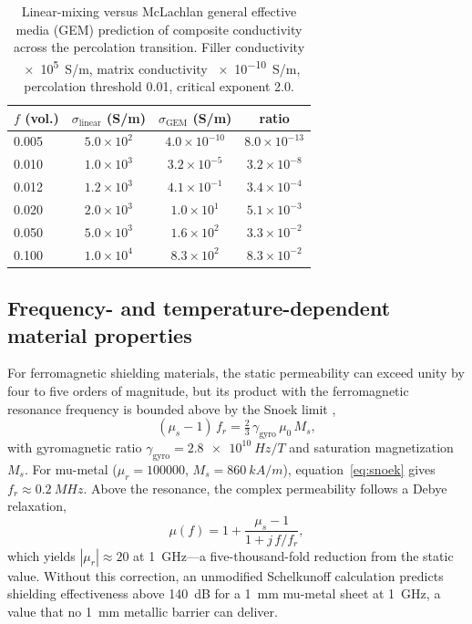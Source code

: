 \documentclass[review,3p,authoryear]{elsarticle}
\begin{document}
\begin{table}[htbp]
\centering
\caption{Linear-mixing versus McLachlan general effective media (GEM) prediction of composite conductivity across the percolation transition. Filler conductivity \SI{e5}{S/m}, matrix conductivity \SI{e-10}{S/m}, percolation threshold \num{0.01}, critical exponent \num{2.0}.}
\label{tab:gem_check}
\begin{tabular}{@{}lccc@{}}
\toprule
$f$ (vol.) & $\sigma_{\mathrm{linear}}$ (\si{S/m}) & $\sigma_{\mathrm{GEM}}$ (\si{S/m}) & ratio \\
\midrule
0.005  & $5.0 \times 10^{2}$  & $4.0 \times 10^{-10}$ & $8.0 \times 10^{-13}$ \\
0.010  & $1.0 \times 10^{3}$  & $3.2 \times 10^{-5}$  & $3.2 \times 10^{-8}$  \\
0.012  & $1.2 \times 10^{3}$  & $4.1 \times 10^{-1}$  & $3.4 \times 10^{-4}$  \\
0.020  & $2.0 \times 10^{3}$  & $1.0 \times 10^{1}$   & $5.1 \times 10^{-3}$  \\
0.050  & $5.0 \times 10^{3}$  & $1.6 \times 10^{2}$   & $3.3 \times 10^{-2}$  \\
0.100  & $1.0 \times 10^{4}$  & $8.3 \times 10^{2}$   & $8.3 \times 10^{-2}$  \\
\bottomrule
\end{tabular}
\end{table}

\subsection{Frequency- and temperature-dependent material properties}
\label{sec:matprops}

For ferromagnetic shielding materials, the static permeability can exceed unity by four to five orders of magnitude, but its product with the ferromagnetic resonance frequency is bounded above by the Snoek limit \citep{Snoek1948},
\begin{equation}
(\mu_s - 1)\, f_r = \tfrac{2}{3}\,\gamma_{\mathrm{gyro}}\, \mu_0\, M_s,
\label{eq:snoek}
\end{equation}
with gyromagnetic ratio $\gamma_{\mathrm{gyro}} = \SI{2.8e10}{Hz/T}$ and saturation magnetization $M_s$. For mu-metal ($\mu_r = \num{100000}$, $M_s = \SI{860}{kA/m}$), equation~\eqref{eq:snoek} gives $f_r \approx \SI{0.2}{MHz}$. Above the resonance, the complex permeability follows a Debye relaxation,
\begin{equation}
\mu(f) = 1 + \frac{\mu_s - 1}{1 + j\,f/f_r},
\label{eq:debye}
\end{equation}
which yields $|\mu_r| \approx 20$ at \SI{1}{GHz}---a five-thousand-fold reduction from the static value. Without this correction, an unmodified Schelkunoff calculation predicts shielding effectiveness above \SI{140}{dB} for a \SI{1}{mm} mu-metal sheet at \SI{1}{GHz}, a value that no \SI{1}{mm} metallic barrier can deliver.
\end{document}
